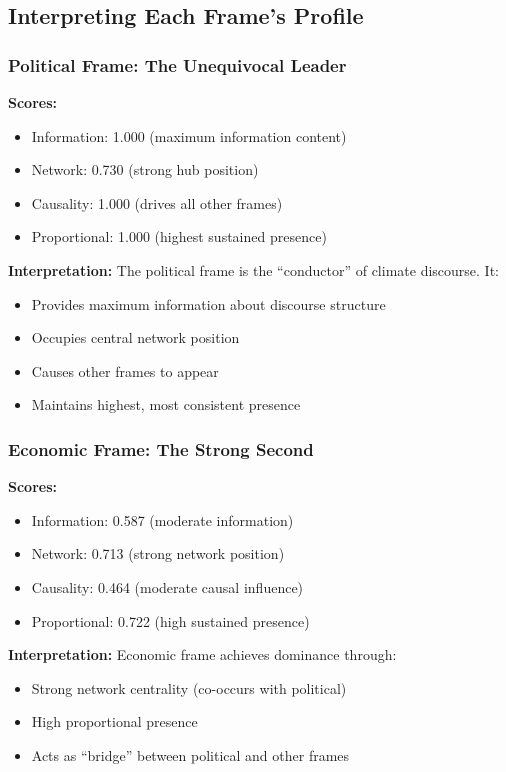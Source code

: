 \documentclass[11pt]{article}
\begin{document}
\subsection{Interpreting Each Frame's Profile}

\subsubsection{Political Frame: The Unequivocal Leader}

\textbf{Scores:}
\begin{itemize}
    \item Information: 1.000 (maximum information content)
    \item Network: 0.730 (strong hub position)
    \item Causality: 1.000 (drives all other frames)
    \item Proportional: 1.000 (highest sustained presence)
\end{itemize}

\textbf{Interpretation:}
The political frame is the ``conductor'' of climate discourse. It:
\begin{itemize}
    \item Provides maximum information about discourse structure
    \item Occupies central network position
    \item Causes other frames to appear
    \item Maintains highest, most consistent presence
\end{itemize}

\subsubsection{Economic Frame: The Strong Second}

\textbf{Scores:}
\begin{itemize}
    \item Information: 0.587 (moderate information)
    \item Network: 0.713 (strong network position)
    \item Causality: 0.464 (moderate causal influence)
    \item Proportional: 0.722 (high sustained presence)
\end{itemize}

\textbf{Interpretation:}
Economic frame achieves dominance through:
\begin{itemize}
    \item Strong network centrality (co-occurs with political)
    \item High proportional presence
    \item Acts as ``bridge'' between political and other frames
\end{itemize}
\end{document}
